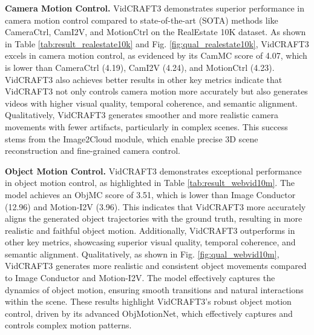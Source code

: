 \noindent \textbf{Camera Motion Control.}
VidCRAFT3 demonstrates superior performance in camera motion control compared to state-of-the-art (SOTA) methods like CameraCtrl, CamI2V, and MotionCtrl on the RealEstate 10K dataset. As shown in Table \ref{tab:result_realestate10k} and Fig. \ref{fig:qual_realestate10k}, VidCRAFT3 excels in camera motion control, as evidenced by its CamMC score of 4.07, which is lower than CameraCtrl (4.19), CamI2V (4.24), and MotionCtrl (4.23). VidCRAFT3 also achieves better results in other key metrics indicate that VidCRAFT3 not only controls camera motion more accurately but also generates videos with higher visual quality, temporal coherence, and semantic alignment. 
Qualitatively, VidCRAFT3 generates smoother and more realistic camera movements with fewer artifacts, particularly in complex scenes. This success stems from the Image2Cloud module, which enable precise 3D scene reconstruction and fine-grained camera control.


\noindent \textbf{Object Motion Control.}
VidCRAFT3 demonstrates exceptional performance in object motion control, as highlighted in Table \ref{tab:result_webvid10m}. The model achieves an ObjMC score of 3.51, which is lower than Image Conductor (12.96) and Motion-I2V (3.96). This indicates that VidCRAFT3 more accurately aligns the generated object trajectories with the ground truth, resulting in more realistic and faithful object motion. Additionally, VidCRAFT3 outperforms in other key metrics, showcasing superior visual quality, temporal coherence, and semantic alignment.
Qualitatively, as shown in Fig. \ref{fig:qual_webvid10m}, VidCRAFT3 generates more realistic and consistent object movements compared to Image Conductor and Motion-I2V. The model effectively captures the dynamics of object motion, ensuring smooth transitions and natural interactions within the scene. These results highlight VidCRAFT3's robust object motion control, driven by its advanced ObjMotionNet, which effectively captures and controls complex motion patterns. 



